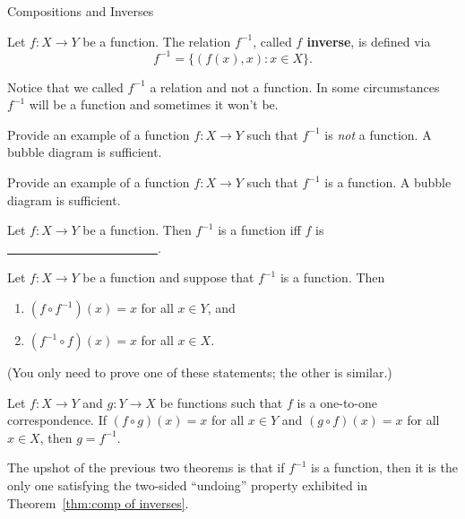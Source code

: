 \begin{section}{Compositions and Inverses}
\begin{definition}
Let $f:X\to Y$ be a function.  The relation $f^{-1}$, called \textbf{$f$ inverse}, is defined via
\[
f^{-1}=\{(f(x),x):x\in X\}.
\]
\end{definition}

\begin{remark}
Notice that we called $f^{-1}$ a relation and not a function.  In some circumstances $f^{-1}$ will be a function and sometimes it won't be.
\end{remark}

\begin{exercise}
Provide an example of a function $f:X\to Y$ such that $f^{-1}$ is \emph{not} a function.  A bubble diagram is sufficient.
\end{exercise}

\begin{exercise}
Provide an example of a function $f:X\to Y$ such that $f^{-1}$ is a function. A bubble diagram is sufficient.
\end{exercise}

\begin{theorem}
Let $f:X\to Y$ be a function.  Then $f^{-1}$ is a function iff $f$ is \underline{\ \ \ \ \ \ \ \ \ \ \ \ \ \ \ \ \ \ \ \ \ \ \ \ }.
\end{theorem}

\begin{theorem}\label{thm:comp of inverses}
Let $f:X\to Y$ be a function and suppose that $f^{-1}$ is a function.  Then
\begin{enumerate}
\item $(f\circ f^{-1})(x)=x$ for all $x\in Y$, and
\item $(f^{-1}\circ f)(x)=x$ for all $x\in X$.
\end{enumerate}
(You only need to prove one of these statements; the other is similar.)
\end{theorem}

\begin{theorem}\label{thm:unique inverse}
Let $f:X\to Y$ and $g:Y\to X$ be functions such that $f$ is a one-to-one correspondence.  If $(f\circ g)(x)=x$ for all $x\in Y$ and $(g\circ f)(x)=x$ for all $x\in X$, then $g=f^{-1}$.
\end{theorem}

\begin{remark}
The upshot of the previous two theorems is that if $f^{-1}$ is a function, then it is the only one satisfying the two-sided ``undoing'' property exhibited in Theorem~\ref{thm:comp of inverses}.
\end{remark}


\end{section}
